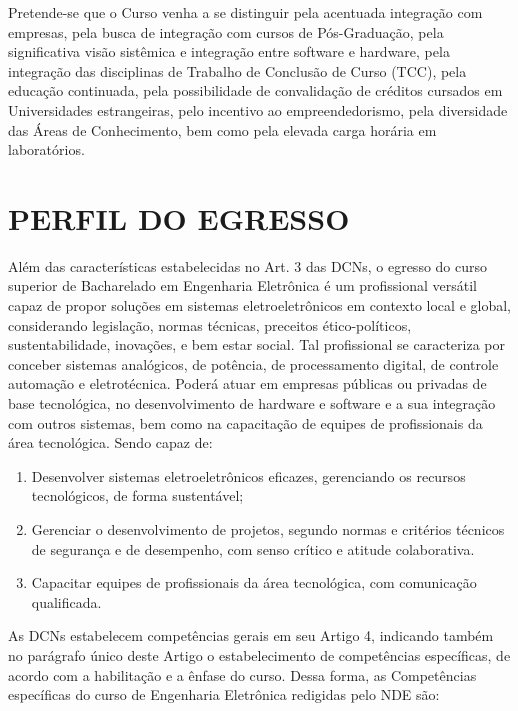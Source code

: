 Pretende-se que o Curso venha a se distinguir pela acentuada integração com empresas, pela busca de integração com cursos de Pós-Graduação, pela significativa visão sistêmica e integração entre software e hardware, pela integração das disciplinas de Trabalho de Conclusão de Curso (TCC), pela educação continuada, pela possibilidade de convalidação de créditos cursados em Universidades estrangeiras, pelo incentivo ao empreendedorismo, pela diversidade das Áreas de Conhecimento, bem como pela elevada carga horária em laboratórios.

\section{PERFIL DO EGRESSO}
\label{sec:perf}

Além das características estabelecidas no Art. 3\textordmasculine{} das DCNs, o egresso do curso superior de Bacharelado em Engenharia Eletrônica é um profissional versátil capaz de propor soluções em sistemas eletroeletrônicos em contexto local e global, considerando legislação, normas técnicas, preceitos ético-políticos, sustentabilidade, inovações, e bem estar social. Tal profissional se caracteriza por conceber sistemas analógicos, de potência, de processamento digital, de controle automação e eletrotécnica. Poderá atuar em empresas públicas ou privadas de base tecnológica, no desenvolvimento de hardware e software e a sua integração com outros sistemas, bem como na capacitação de equipes de profissionais da área tecnológica. Sendo capaz de:


\renewcommand{\labelenumi}{\roman{enumi}}
\begin{enumerate}
	\item Desenvolver sistemas eletroeletrônicos eficazes, gerenciando os recursos tecnológicos, de forma sustentável; 
	\item Gerenciar o desenvolvimento de projetos, segundo normas e critérios técnicos de segurança e de desempenho, com senso crítico e atitude colaborativa. 
	\item Capacitar equipes de profissionais da área tecnológica, com comunicação qualificada.
\end{enumerate} 

As DCNs \cite{dcneng} estabelecem competências gerais em seu Artigo 4\textordmasculine, indicando também no parágrafo único deste Artigo o estabelecimento de competências específicas, de acordo com a habilitação e a ênfase do curso. Dessa forma, as Competências específicas do curso de Engenharia Eletrônica redigidas pelo NDE são:

